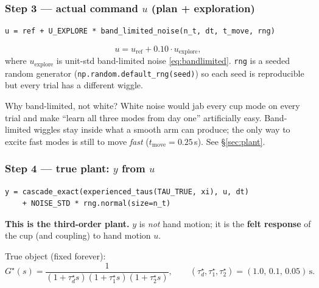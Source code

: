 \documentclass[11pt,a4paper]{article}
\begin{document}
\subsubsection{Step 3 --- actual command $u$ (plan + exploration)}

\begin{verbatim}
u = ref + U_EXPLORE * band_limited_noise(n_t, dt, t_move, rng)
\end{verbatim}

\begin{equation}
u = u_{\mathrm{ref}} + 0.10\cdot u_{\mathrm{explore}},
\label{eq:l4u}
\end{equation}
where $u_{\mathrm{explore}}$ is unit-std band-limited noise
\eqref{eq:bandlimited}.  \texttt{rng} is a seeded random generator
(\texttt{np.random.default\_rng(seed)}) so each seed is reproducible but
every trial has a different wiggle.

\begin{examplebox}{Why band-limited, not white?}
White noise would jab every cup mode on every trial and make ``learn all
three modes from day one'' artificially easy.  Band-limited wiggles stay
inside what a smooth arm can produce; the only way to excite fast modes is
still to move \emph{fast} ($t_{\mathrm{move}}=0.25$\,s).  See
\S\ref{sec:plant}.
\end{examplebox}

\subsubsection{Step 4 --- true plant: $y$ from $u$}

\begin{verbatim}
y = cascade_exact(experienced_taus(TAU_TRUE, xi), u, dt)
    + NOISE_STD * rng.normal(size=n_t)
\end{verbatim}

\textbf{This is the third-order plant.}  $y$ is \emph{not} hand motion; it is
the \textbf{felt response} of the cup (and coupling) to hand motion $u$.

True object (fixed forever):
\begin{equation}
G^\star(s)=\frac{1}{(1+\tau_d^\star s)(1+\tau_1^\star s)(1+\tau_2^\star s)},
\qquad
(\tau_d^\star,\tau_1^\star,\tau_2^\star)=(1.0,\,0.1,\,0.05)\,\mathrm{s}.
\label{eq:l4true}
\end{equation}
\end{document}

